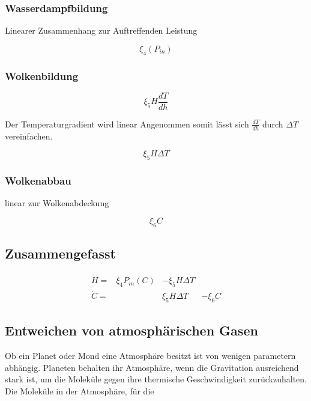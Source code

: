 \begin{refsection}
\subsubsection{Wasserdampfbildung}

Linearer Zusammenhang zur Auftreffenden Leistung

\begin{equation}
\xi_4 (P_{in})
\end{equation}

\subsubsection{Wolkenbildung}

\begin{equation}
\xi_5 H \frac{dT}{dh}
\end{equation}

Der Temperaturgradient wird linear Angenommen somit lässt sich $\frac{dT}{dh}$ durch $\Delta T $ vereinfachen. 

\begin{equation}
\xi_5 H \Delta T
\end{equation}

\subsubsection{Wolkenabbau}

linear zur Wolkenabdeckung

\begin{equation}
\xi_6 C
\end{equation}

\subsection{Zusammengefasst}

\begin{equation}
	\begin{matrix}			
		\dot{H} = & \xi_4 P_{in}(C) & - \xi_5 H \Delta T & \\
		\dot{C} = &                 &   \xi_5 H \Delta T & - \xi_6 C
	\end{matrix}	
\end{equation}


\subsection{Entweichen von atmosphärischen Gasen}

Ob ein Planet oder Mond eine Atmosphäre besitzt ist von wenigen parametern abhängig. Planeten behalten ihr Atmosphäre, wenn die Gravitation ausreichend stark ist, um die Moleküle gegen ihre thermische Geschwindigkeit zurückzuhalten.
Die Moleküle in der Atmosphäre, für die


\end{refsection}
